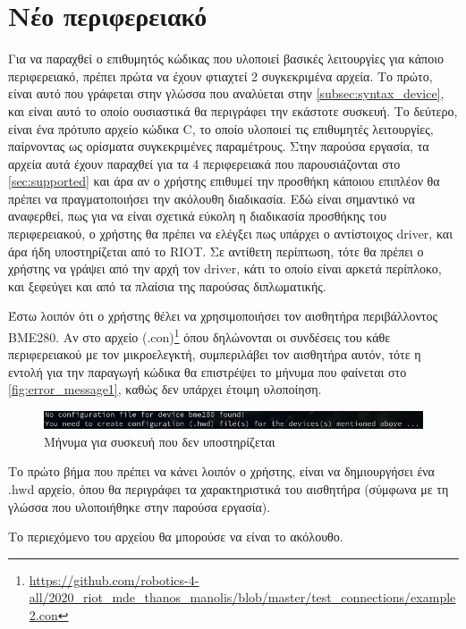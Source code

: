 \section{Νέο περιφερειακό}
\label{sec:example2}

Για να παραχθεί ο επιθυμητός κώδικας που υλοποιεί βασικές λειτουργίες για κάποιο περιφερειακό, πρέπει πρώτα να έχουν φτιαχτεί 2 συγκεκριμένα αρχεία. Το πρώτο, είναι αυτό που γράφεται στην γλώσσα που αναλύεται στην \autoref{subsec:syntax_device}, και είναι αυτό το οποίο ουσιαστικά θα περιγράφει την εκάστοτε συσκευή. Το δεύτερο, είναι ένα πρότυπο αρχείο κώδικα C, το οποίο υλοποιεί τις επιθυμητές λειτουργίες, παίρνοντας ως ορίσματα συγκεκριμένες παραμέτρους. Στην παρούσα εργασία, τα αρχεία αυτά έχουν παραχθεί για τα 4 περιφερειακά που παρουσιάζονται στο \autoref{sec:supported} και άρα αν ο χρήστης επιθυμεί την προσθήκη κάποιου επιπλέον θα πρέπει να πραγματοποιήσει την ακόλουθη διαδικασία. Εδώ είναι σημαντικό να αναφερθεί, πως για να είναι σχετικά εύκολη η διαδικασία προσθήκης του περιφερειακού, ο χρήστης θα πρέπει να ελέγξει πως υπάρχει ο αντίστοιχος driver, και άρα ήδη υποστηρίζεται από το RIOT. Σε αντίθετη περίπτωση, τότε θα πρέπει ο χρήστης να γράψει από την αρχή τον driver, κάτι το οποίο είναι αρκετά περίπλοκο, και ξεφεύγει και από τα πλαίσια της παρούσας διπλωματικής.

Έστω λοιπόν ότι ο χρήστης θέλει να χρησιμοποιήσει τον αισθητήρα περιβάλλοντος BME280. Αν στο αρχείο (.con)\footnote{\url{https://github.com/robotics-4-all/2020_riot_mde_thanos_manolis/blob/master/test_connections/example2.con}} όπου δηλώνονται οι συνδέσεις του κάθε περιφερειακού με τον μικροελεγκτή, συμπεριλάβει τον αισθητήρα αυτόν, τότε η εντολή για την παραγωγή κώδικα θα επιστρέψει το μήνυμα που φαίνεται στο \autoref{fig:error_message1}, καθώς δεν υπάρχει έτοιμη υλοποίηση.

\begin{figure}[!ht]
	\centering
	\includegraphics[width=1.0\textwidth]{./images/chapter6/error_message1.png}
	\caption{Μήνυμα για συσκευή που δεν υποστηρίζεται}
	\label{fig:error_message1}
\end{figure}

Το πρώτο βήμα που πρέπει να κάνει λοιπόν ο χρήστης, είναι να δημιουργήσει ένα .hwd αρχείο, όπου θα περιγράφει τα χαρακτηριστικά του αισθητήρα (σύμφωνα με τη γλώσσα που υλοποιήθηκε στην παρούσα εργασία).

Το περιεχόμενο του αρχείου θα μπορούσε να είναι το ακόλουθο.

